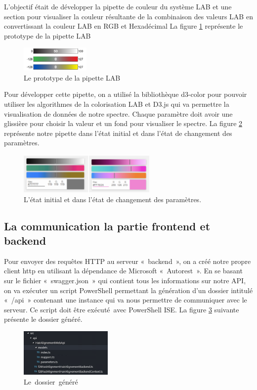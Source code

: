 \newpage
L’objectif était de développer la pipette de couleur du système LAB et une section pour visualiser la couleur résultante de la combinaison des valeurs LAB en convertissant la couleur LAB en RGB et Hexadécimal 
La figure \ref{fig:pip} représente le prototype de la pipette LAB

\begin{figure}[!ht]\centering
\includegraphics[width=0.3\textwidth]{chapitres/chapitre5/figures/RGB-2.png}
\caption{Le prototype de la pipette LAB}
\label{fig:pip}
\end{figure}

Pour développer cette pipette, on a utilisé la bibliothèque d3-color pour pouvoir utiliser les algorithmes de la colorisation LAB et D3.js qui va permettre la visualisation de données de notre spectre. Chaque paramètre doit avoir une glissière pour choisir la valeur et un fond pour visualiser le spectre.
La figure \ref{fig:rgb} représente notre pipette dans l’état initial et dans l’état de changement des paramètres.
\begin{figure}[!ht]\centering
\includegraphics[width=0.6\textwidth]{chapitres/chapitre5/figures/RGB-Double.png}
\caption{L’état initial et dans l’état de changement des paramètres.}
\label{fig:rgb}
\end{figure}

\subsection{La communication la partie frontend et backend}
Pour envoyer des requêtes HTTP au serveur « backend », on a créé notre propre client http en utilisant la dépendance de Microsoft « Autorest ». En se basant sur le fichier « swagger.json » qui contient tous les informations sur notre API, on va exécuter un script PowerShell permettant la génération d’un dossier intitulé « /api » contenant une instance qui va nous permettre de communiquer avec le serveur. Ce script doit être exécuté avec PowerShell ISE.
La figure \ref{fig:dossier} suivante présente le dossier généré.
\begin{figure}[!ht]\centering
\includegraphics[width=0.4\textwidth]{chapitres/chapitre5/figures/TS.png}
\caption{Le\textcolor{white}{J}dossier\textcolor{white}{J}généré}
\label{fig:dossier}
\end{figure}

